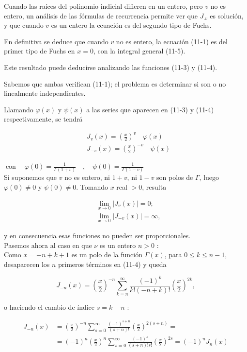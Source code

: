 \documentclass[10pt]{article}
\theoremstyle{plain}
\theoremstyle{definition}
\theoremstyle{remark}
\begin{document}
Cuando las raíces del polinomio indicial difieren en un entero, pero $v$ no es entero, un análisis de las fórmulas de recurrencia permite ver que $J_{. v}$ es solución, y que cuando $v$ es un entero la ecuación es del segundo tipo de Fuchs.

En definitiva se deduce que cuando $v$ no es entero, la ecuación (11-1) es del primer tipo de Fuchs en $x=0$, con la integral general (11-5).

Este resultado puede deducirse analizando las funciones (11-3) y (11-4).

Sabemos que ambas verifican (11-1); el problema es determinar si son o no linealmente independientes.

Llamando $\varphi(x)$ y $\psi(x)$ a las series que aparecen en (11-3) y (11-4) respectivamente, se tendrá

$$
\begin{aligned}
& J_{v}(x)=\left(\frac{x}{2}\right)^{v} \quad \varphi(x) \\
& J_{-v}(x)=\left(\frac{x}{2}\right)^{-v} \quad \psi(x)
\end{aligned}
$$

$\operatorname{con} \quad \varphi(0)=\frac{1}{\Gamma(1+v)} \quad, \quad \psi(0)=\frac{1}{\Gamma(1-v)}$\\
Si suponemos que $v$ no es entero, ni $1+v$, ni $1-v$ son polos de $\Gamma$, luego $\varphi(0) \neq 0$ y $\psi(0) \neq 0$. Tomando $x$ real $>0$, resulta


\begin{align*}
& \lim _{x \rightarrow 0}\left|J_{v}(x)\right|=0 ; \\
& \lim _{x \rightarrow 0}\left|J_{-v}(x)\right|=\infty, \tag{$11\cdot6$}
\end{align*}


y en consecuencia esas funciones no pueden ser proporcionales.\\
Pasemos ahora al caso en que $\nu$ es un entero $n>0$ :\\
Como $x=-n+k+1$ es un polo de la función $\Gamma(x)$, para $0 \leqslant k \leqslant n-1$, desaparecen los $n$ primeros términos en (11-4) y queda

$$
J_{-n}(x)=\left(\frac{x}{2}\right)^{-n} \sum_{k=n}^{\infty} \frac{(-1)^{k}}{k!(-n+k)!}\left(\frac{x}{2}\right)^{2 k},
$$

o haciendo el cambio de índice $s=k-n$ :

$$
\begin{aligned}
J_{-n}(x) & =\left(\frac{x}{2}\right)^{-n} \sum_{s=0}^{\infty} \frac{(-1)^{s+n}}{(s+n)!}\left(\frac{x}{2}\right)^{2(s+n)}= \\
& =(-1)^{n}\left(\frac{x}{2}\right)^{n} \sum_{s=0}^{\infty} \frac{(-1)^{s}}{(s+n)!s!}\left(\frac{x}{2}\right)^{2 s}=(-1)^{n} J_{n}(x)
\end{aligned}
$$
\end{document}
